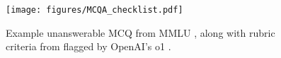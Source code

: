 \begin{figure}
    \centering
    \texttt{[image: figures/MCQA\_checklist.pdf]}
    \vspace{-4.75ex}
    \setlength{\fboxsep}{0pt}
    \caption{\small Example unanswerable MCQ from MMLU \cite{gema2024we}, along with rubric criteria from \citet{haladyna1989taxonomy} flagged by OpenAI's o1 \cite{jaech2024openai}.}
    \label{fig:checklist}
    \vspace{-1.7ex}
\end{figure}